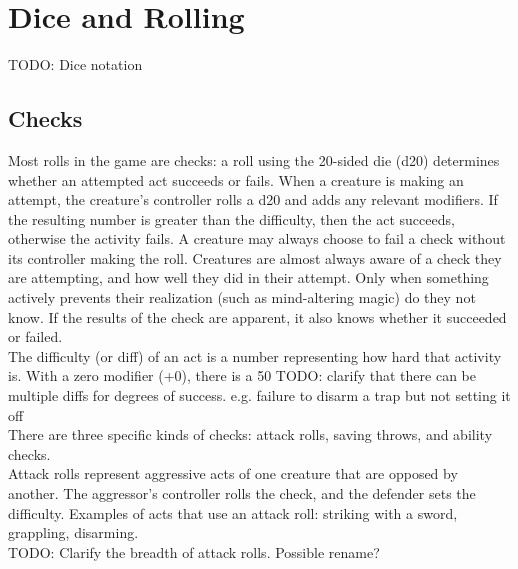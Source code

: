 \documentclass[letterpaper,titlepage,openany,twocolumn]{book}
\begin{document}
\chapter{Dice and Rolling}
TODO: Dice notation\\

\section{Checks}
Most rolls in the game are checks: a roll using the 20-sided die (d20) determines whether an attempted act succeeds or fails. When a creature is making an attempt, the creature’s controller rolls a d20 and adds any relevant modifiers. If the resulting number is greater than the difficulty, then the act succeeds, otherwise the activity fails. A creature may always choose to fail a check without its controller making the roll. Creatures are almost always aware of a check they are attempting, and how well they did in their attempt. Only when something actively prevents their realization (such as mind-altering magic) do they not know. If the results of the check are apparent, it also knows whether it succeeded or failed.\\

The difficulty (or diff) of an act is a number representing how hard that activity is. With a zero modifier (+0), there is a 50%
TODO: clarify that there can be multiple diffs for degrees of success. e.g. failure to disarm a trap but not setting it off\\

There are three specific kinds of checks: attack rolls, saving throws, and ability checks.\\

Attack rolls represent aggressive acts of one creature that are opposed by another. The aggressor's controller rolls the check, and the defender sets the difficulty. Examples of acts that use an attack roll: striking with a sword, grappling, disarming.\\
TODO: Clarify the breadth of attack rolls. Possible rename?\\
\end{document}
